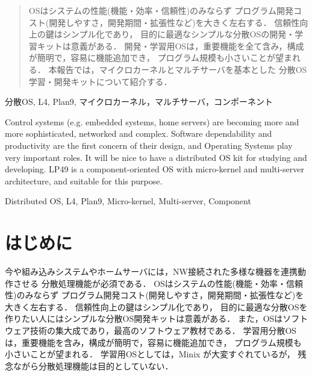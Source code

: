 \documentclass{ieicej}
\begin{document}
\begin{abstract}
OSはシステムの性能(機能・効率・信頼性)のみならず
プログラム開発コスト(開発しやすさ，開発期間・拡張性など)を大きく左右する．
信頼性向上の鍵はシンプル化であり，
目的に最適なシンプルな分散OSの開発・学習キットは意義がある．
%
開発・学習用OSは，重要機能を全て含み，構成が簡明で，容易に機能追加でき，
プログラム規模も小さいことが望まれる．
本報告では，マイクロカーネルとマルチサーバを基本とした
分散OS学習・開発キットについて紹介する．

\end{abstract}

\begin{keyword}
分散OS, L4, Plan9, マイクロカーネル，マルチサーバ，コンポーネント 
\end{keyword}
\begin{eabstract}
  Control systems (e.g. embedded systems, home servers) are becoming more and more sophisticated, 
  networked and complex. 
  Software dependability and productivity are the first concern of their design,  
  and Operating Systems play very important roles.
  It will be nice to have a distributed OS kit for studying and developing.
  LP49 is a component-oriented OS with micro-kernel and multi-server architecture,
  and suitable for this purpose. 
\end{eabstract}
\begin{ekeyword}
Distributed OS, L4, Plan9, Micro-kernel, Multi-server, Component 
\end{ekeyword}

\maketitle


\section{はじめに}

  今や組み込みシステムやホームサーバには，NW接続された多様な機器を連携動作させる
分散処理機能が必須である．
OSはシステムの性能(機能・効率・信頼性)のみならず
プログラム開発コスト(開発しやすさ，開発期間・拡張性など)を大きく左右する．
信頼性向上の鍵はシンプル化であり，
目的に最適な分散OSを作りたい人にはシンプルな分散OS開発キットは意義がある．
%
  また，OSはソフトウェア技術の集大成であり，最高のソフトウェア教材である．
学習用分散OSは，重要機能を含み，構成が簡明で，容易に機能追加でき，
プログラム規模も小さいことが望まれる．
学習用OSとしては，Minix が大変すぐれているが，
残念ながら分散処理機能は目的としていない．
\end{document}
